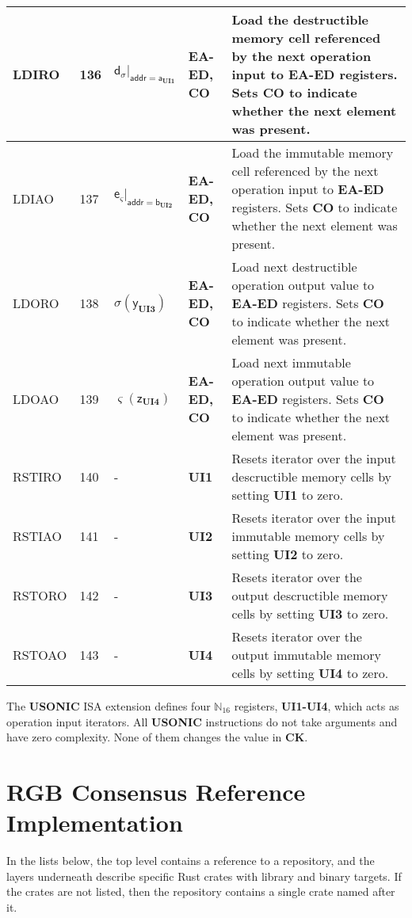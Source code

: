 \documentclass[9pt,oneside]{amsart}
\begin{document}
\begin{table}[h]
\begin{tabular}{l p{1cm} l p{1.5cm} p{9.3cm}}
LDIRO	&136	&$\mathsf{d}_\sigma|_{\mathsf{addr} = \mathsf{a}_\mathbf{UI1}}$	&\textbf{EA-ED, CO}	&Load the destructible memory cell referenced by the next operation input to \textbf{EA-ED} registers. Sets \textbf{CO} to indicate whether the next element was present. \\ \midrule
LDIAO	&137	&$\mathsf{e}_\varsigma|_{\mathsf{addr} = \mathsf{b}_\mathbf{UI2}}$	&\textbf{EA-ED, CO}	&Load the immutable memory cell referenced by the next operation input to \textbf{EA-ED} registers. Sets \textbf{CO} to indicate whether the next element was present. \\ \midrule
LDORO	&138	&$\sigma(\mathsf{y}_\mathbf{UI3})$	&\textbf{EA-ED, CO}	&Load next destructible operation output value to \textbf{EA-ED} registers. Sets \textbf{CO} to indicate whether the next element was present. \\ \midrule
LDOAO	&139	&$\varsigma(\mathsf{z}_\mathbf{UI4})$	&\textbf{EA-ED, CO}	&Load next immutable operation output value to \textbf{EA-ED} registers. Sets \textbf{CO} to indicate whether the next element was present. \\ \midrule
RSTIRO	&140	&-	&\textbf{UI1}	&Resets iterator over the input descructible memory cells by setting \textbf{UI1} to zero. \\ \midrule
RSTIAO	&141	&-	&\textbf{UI2}	&Resets iterator over the input immutable memory cells by setting \textbf{UI2} to zero. \\ \midrule
RSTORO	&142	&-	&\textbf{UI3}	&Resets iterator over the output descructible memory cells by setting \textbf{UI3} to zero. \\ \midrule
RSTOAO	&143	&-	&\textbf{UI4}	&Resets iterator over the output immutable memory cells by setting \textbf{UI4} to zero. \\
\bottomrule
\end{tabular}
\end{table}

The \textbf{USONIC} ISA extension defines four $\mathbb{N}_{16}$ registers, \textbf{UI1-UI4}, which acts as operation input iterators.
All \textbf{USONIC} instructions do not take arguments and have zero complexity. None of them changes the value in \textbf{CK}.


\newpage
\section{RGB Consensus Reference Implementation}\label{ap:impl}

In the lists below, the top level contains a reference to a repository,
and the layers underneath describe specific Rust crates with library and binary targets.
If the crates are not listed, then the repository contains a single crate named after it.
\end{document}
